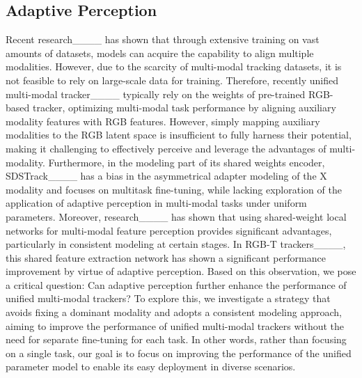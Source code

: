 \subsection{Adaptive Perception}
Recent research____ has shown that through extensive training on vast amounts of datasets, models can acquire the capability to align multiple modalities. However, due to the scarcity of multi-modal tracking datasets, it is not feasible to rely on large-scale data for training.
Therefore, recently unified multi-modal tracker____ typically rely on the weights of pre-trained RGB-based tracker, optimizing multi-modal task performance by aligning auxiliary modality features with RGB features. However, simply mapping auxiliary modalities to the RGB latent space is insufficient to fully harness their potential, making it challenging to effectively perceive and leverage the advantages of multi-modality. Furthermore, in the modeling part of its shared weights encoder, SDSTrack____ has a bias in the asymmetrical adapter modeling of the X modality and focuses on multitask fine-tuning, while lacking exploration of the application of adaptive perception in multi-modal tasks under uniform parameters. Moreover, research____  has shown that using shared-weight local networks for multi-modal feature perception provides significant advantages, particularly in consistent modeling at certain stages. In RGB-T trackers____, this shared feature extraction network has shown a significant performance improvement by virtue of adaptive perception. Based on this observation, we pose a critical question: Can adaptive perception further enhance the performance of unified multi-modal trackers? To explore this, we investigate a strategy that avoids fixing a dominant modality and adopts a consistent modeling approach, aiming to improve the performance of unified multi-modal trackers without the need for separate fine-tuning for each task. In other words, rather than focusing on a single task, our goal is to focus on improving the performance of the unified parameter model to enable its easy deployment in diverse scenarios.


